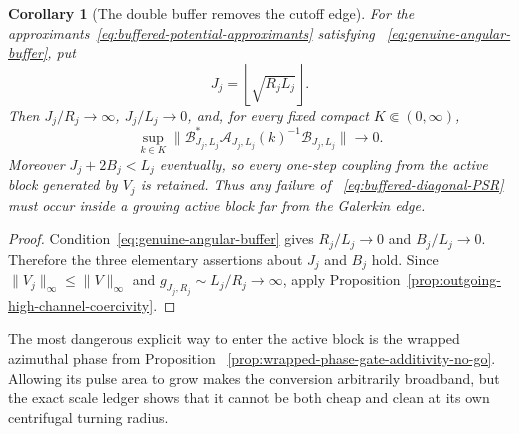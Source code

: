 \documentclass[11pt]{article}
\newtheorem{corollary}[theorem]{Corollary}
\theoremstyle{definition}
\theoremstyle{remark}
\begin{document}
\begin{corollary}[The double buffer removes the cutoff edge]
\label{cor:double-buffer-removes-edge}
For the approximants~\eqref{eq:buffered-potential-approximants} satisfying
~\eqref{eq:genuine-angular-buffer}, put
\begin{equation}
 J_j=\left\lfloor\sqrt{R_jL_j}\right\rfloor.
 \label{eq:active-angular-cutoff}
\end{equation}
Then $J_j/R_j\to\infty$, $J_j/L_j\to0$, and, for every fixed compact
$K\Subset(0,\infty)$,
\begin{equation}
 \sup_{k\in K}
 \|\mathcal B_{J_j,L_j}^*\mathcal A_{J_j,L_j}(k)^{-1}
       \mathcal B_{J_j,L_j}\|\longrightarrow0.
 \label{eq:buffered-edge-self-energy-vanishes}
\end{equation}
Moreover $J_j+2B_j<L_j$ eventually, so every one-step coupling from the active
block generated by $V_j$ is retained.  Thus any failure of
~\eqref{eq:buffered-diagonal-PSR} must occur inside a growing active block far
from the Galerkin edge.
\end{corollary}

\begin{proof}
Condition~\eqref{eq:genuine-angular-buffer} gives
$R_j/L_j\to0$ and $B_j/L_j\to0$.  Therefore the three elementary assertions
about $J_j$ and $B_j$ hold.  Since
$\|V_j\|_\infty\leq\|V\|_\infty$ and
$g_{J_j,R_j}\sim L_j/R_j\to\infty$, apply
Proposition~\ref{prop:outgoing-high-channel-coercivity}.
\end{proof}

The most dangerous explicit way to enter the active block is the wrapped
azimuthal phase from Proposition
~\ref{prop:wrapped-phase-gate-additivity-no-go}.  Allowing its pulse area to
grow makes the conversion arbitrarily broadband, but the exact scale ledger
shows that it cannot be both cheap and clean at its own centrifugal turning
radius.
\end{document}
